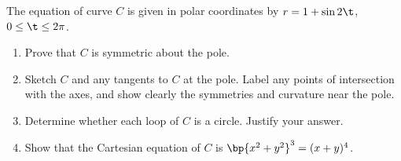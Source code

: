 \begin{problem}
    The equation of curve $C$ is given in polar coordinates by $r = 1 + \sin 2\t$, $0 \leq \t \leq 2\pi$. 
    \begin{enumerate}
        \item Prove that $C$ is symmetric about the pole.
        \item Sketch $C$ and any tangents to $C$ at the pole. Label any points of intersection with the axes, and show clearly the symmetries and curvature near the pole.
        \item Determine whether each loop of $C$ is a circle. Justify your answer.
        \item Show that the Cartesian equation of $C$ is $\bp{x^2 + y^2}^3 = (x+y)^4$.
    \end{enumerate}
\end{problem}
\clearpage
